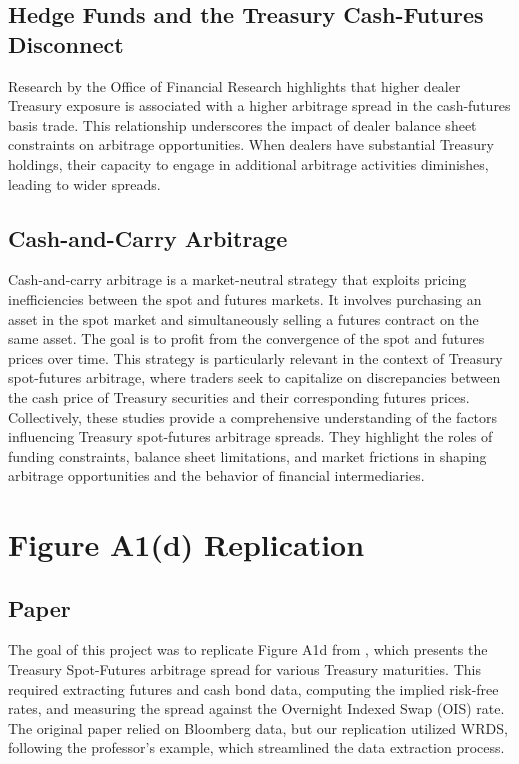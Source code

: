 \documentclass{article}
\begin{document}
\subsection{Hedge Funds and the Treasury Cash-Futures Disconnect}
Research by the Office of Financial Research highlights that higher dealer Treasury exposure is associated with a higher arbitrage spread in the cash-futures basis trade. This relationship underscores the impact of dealer balance sheet constraints on arbitrage opportunities. When dealers have substantial Treasury holdings, their capacity to engage in additional arbitrage activities diminishes, leading to wider spreads.

\subsection{Cash-and-Carry Arbitrage}
Cash-and-carry arbitrage is a market-neutral strategy that exploits pricing inefficiencies between the spot and futures markets. It involves purchasing an asset in the spot market and simultaneously selling a futures contract on the same asset. The goal is to profit from the convergence of the spot and futures prices over time. This strategy is particularly relevant in the context of Treasury spot-futures arbitrage, where traders seek to capitalize on discrepancies between the cash price of Treasury securities and their corresponding futures prices. Collectively, these studies provide a comprehensive understanding of the factors influencing Treasury spot-futures arbitrage spreads. They highlight the roles of funding constraints, balance sheet limitations, and market frictions in shaping arbitrage opportunities and the behavior of financial intermediaries.




\newpage



\section{Figure A1(d) Replication}
\subsection{Paper}

The goal of this project was to replicate Figure A1d from \cite{siriwardane2023segmented}, which presents the Treasury Spot-Futures arbitrage spread for various Treasury maturities. This required extracting futures and cash bond data, computing the implied risk-free rates, and measuring the spread against the Overnight Indexed Swap (OIS) rate. The original paper relied on Bloomberg data, but our replication utilized WRDS, following the professor’s example, which streamlined the data extraction process.
\end{document}

